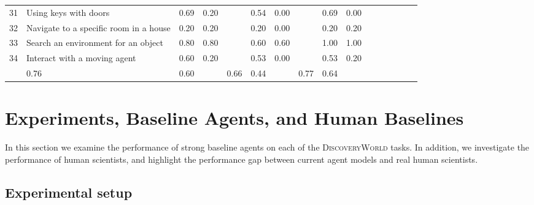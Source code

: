 \documentclass{article}
\newcommand{\env}{\textsc{DiscoveryWorld}\xspace}
\begin{document}
\begin{table}[!t]
\begin{tabular}{llccc c ccc c ccc ccc}
\rowcolor[HTML]{E3E3E3}
31  & Using keys with doors & \cellcolor[HTML]{a864cb}0.69 & \cellcolor[HTML]{d2e4f0}0.20 & & \cellcolor[HTML]{bb86d6}0.54 & \cellcolor[HTML]{ffffff}0.00 & & \cellcolor[HTML]{a864cb}0.69 & \cellcolor[HTML]{ffffff}0.00 \\ 
\rowcolor[HTML]{FFFFFF}
32  & Navigate to a specific room in a house & \cellcolor[HTML]{e6d2f0}0.20 & \cellcolor[HTML]{d2e4f0}0.20 & & \cellcolor[HTML]{e6d2f0}0.20 & \cellcolor[HTML]{ffffff}0.00 & & \cellcolor[HTML]{e6d2f0}0.20 & \cellcolor[HTML]{d2e4f0}0.20 \\ 
\rowcolor[HTML]{E3E3E3}
33  & Search an environment for an object & \cellcolor[HTML]{9a4cc3}0.80 & \cellcolor[HTML]{4c92c3}0.80 & & \cellcolor[HTML]{b379d2}0.60 & \cellcolor[HTML]{79add2}0.60 & & \cellcolor[HTML]{811fb4}1.00 & \cellcolor[HTML]{1f77b4}1.00 \\ 
\rowcolor[HTML]{FFFFFF}
34  & Interact with a moving agent & \cellcolor[HTML]{b379d2}0.60 & \cellcolor[HTML]{d2e4f0}0.20 & & \cellcolor[HTML]{bc88d7}0.53 & \cellcolor[HTML]{ffffff}0.00 & & \cellcolor[HTML]{bc88d7}0.53 & \cellcolor[HTML]{d2e4f0}0.20 \\ 
\midrule
\rowcolor[HTML]{E3E3E3}
\multicolumn{2}{l}{\textbf{Average (Unit Tests)}} & \cellcolor[HTML]{9f55c6}0.76 & \cellcolor[HTML]{79add2}0.60 & & \cellcolor[HTML]{ac6bce}0.66 & \cellcolor[HTML]{9dc3de}0.44 & & \cellcolor[HTML]{9e52c5}0.77 & \cellcolor[HTML]{70a8cf}0.64 \\ 

\bottomrule
\end{tabular}
\end{table}















\section{Experiments, Baseline Agents, and Human Baselines}

In this section we examine the performance of strong baseline agents on each of the \env tasks.  In addition, we investigate the performance of human scientists, and highlight the performance gap between current agent models and real human scientists. 

\subsection{Experimental setup}
\end{document}
